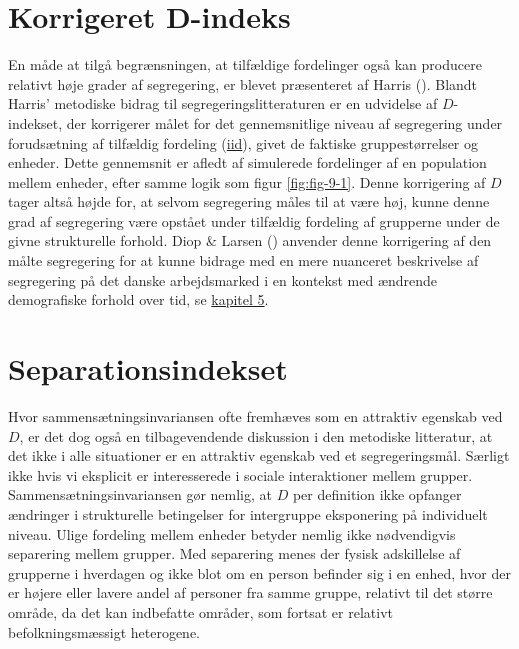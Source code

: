 \documentclass[
]{book}
\begin{document}
\section{Korrigeret D-indeks}\label{korrigeret-d-indeks}

En måde at tilgå begrænsningen, at tilfældige fordelinger også kan producere relativt høje grader af segregering, er blevet præsenteret af Harris (). Blandt Harris' metodiske bidrag til segregeringslitteraturen er en udvidelse af \(D\)-indekset, der korrigerer målet for det gennemsnitlige niveau af segregering under forudsætning af tilfældig fordeling (\href{https://en.wikipedia.org/wiki/Independent_and_identically_distributed_random_variables}{iid}), givet de faktiske gruppestørrelser og enheder. Dette gennemsnit er afledt af simulerede fordelinger af en population mellem enheder, efter samme logik som figur \ref{fig:fig-9-1}. Denne korrigering af \(D\) tager altså højde for, at selvom segregering måles til at være høj, kunne denne grad af segregering være opstået under tilfældig fordeling af grupperne under de givne strukturelle forhold. Diop \& Larsen () anvender denne korrigering af den målte segregering for at kunne bidrage med en mere nuanceret beskrivelse af segregering på det danske arbejdsmarked i en kontekst med ændrende demografiske forhold over tid, se \hyperref[kap5]{kapitel 5}.

\section{Separationsindekset}\label{separationsindekset}

Hvor sammensætningsinvariansen ofte fremhæves som en attraktiv egenskab ved \(D\), er det dog også en tilbagevendende diskussion i den metodiske litteratur, at det ikke i alle situationer er en attraktiv egenskab ved et segregeringsmål. Særligt ikke hvis vi eksplicit er interesserede i sociale interaktioner mellem grupper. Sammensætningsinvariansen gør nemlig, at \(D\) per definition ikke opfanger ændringer i strukturelle betingelser for intergruppe eksponering på individuelt niveau. Ulige fordeling mellem enheder betyder nemlig ikke nødvendigvis separering mellem grupper. Med separering menes der fysisk adskillelse af grupperne i hverdagen og ikke blot om en person befinder sig i en enhed, hvor der er højere eller lavere andel af personer fra samme gruppe, relativt til det større område, da det kan indbefatte områder, som fortsat er relativt befolkningsmæssigt heterogene.
\end{document}
